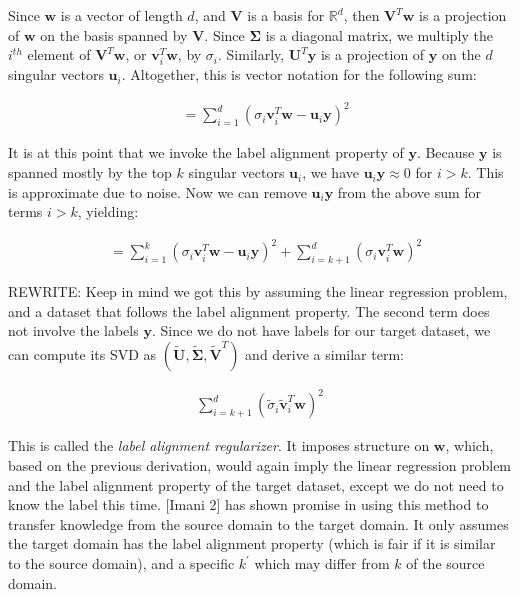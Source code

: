 \documentclass[twoside,11pt]{article}
\begin{document}
Since $\mathbf{w}$ is a vector of length $d$, and $\mathbf{V}$ is a basis for $\mathbb{R}^d$, then $\mathbf{V}^T \mathbf{w}$ is a projection of $\mathbf{w}$ on the basis spanned by $\mathbf{V}$. Since $\mathbf{\Sigma}$ is a diagonal matrix, we multiply the $i^{th}$ element of $\mathbf{V}^T \mathbf{w}$, or $\mathbf{v}_i^T \mathbf{w}$, by $\sigma_i$. Similarly, $\mathbf{U}^T \mathbf{y}$ is a projection of $\mathbf{y}$ on the $d$ singular vectors $\mathbf{u}_i$. Altogether, this is vector notation for the following sum:

$$
\begin{aligned}
&= \sum_{i=1}^d (\sigma_i \mathbf{v}_i^T \mathbf{w} - \mathbf{u}_i \mathbf{y})^2
\end{aligned}
$$

It is at this point that we invoke the label alignment property of $\mathbf{y}$. Because $\mathbf{y}$ is spanned mostly by the top $k$ singular vectors $\mathbf{u}_i$, we have $\mathbf{u}_i \mathbf{y} \approx 0$ for $i>k$. This is approximate due to noise. Now we can remove $\mathbf{u}_i \mathbf{y}$ from the above sum for terms $i>k$, yielding: 

$$
\begin{aligned}
&= \sum_{i=1}^k (\sigma_i \mathbf{v}_i^T \mathbf{w} - \mathbf{u}_i \mathbf{y})^2 + \sum_{i=k+1}^d (\sigma_i \mathbf{v}_i^T \mathbf{w} )^2
\end{aligned}
$$

REWRITE: Keep in mind we got this by assuming the linear regression problem, and a dataset that follows the label alignment property. The second term does not involve the labels $\mathbf{y}$. Since we do not have labels for our target dataset, we can compute its SVD as $(\mathbf{\tilde{U}}, \mathbf{\tilde{\Sigma}}, \mathbf{\tilde{V}}^T)$ and derive a similar term:

$$
\begin{aligned}
\sum_{i=k+1}^d (\tilde{\sigma}_i \tilde{\mathbf{v}}_i^T \mathbf{w} )^2
\end{aligned}
$$

This is called the \emph{label alignment regularizer}. It imposes structure on $\mathbf{w}$, which, based on the previous derivation, would again imply the linear regression problem and the label alignment property of the target dataset, except we do not need to know the label this time. [Imani 2] has shown promise in using this method to transfer knowledge from the source domain to the target domain. It only assumes the target domain has the label alignment property (which is fair if it is similar to the source domain), and a specific $k^\prime$ which may differ from $k$ of the source domain. 
\end{document}
